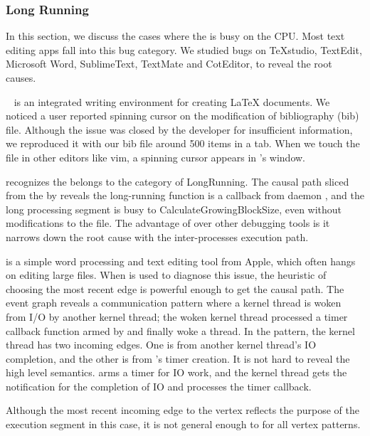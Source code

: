 \subsubsection{Long Running}

In this section, we discuss the cases where the \spinningnode is busy on the
CPU. Most text editing apps fall into this bug category. We studied bugs on
TeXstudio, TextEdit, Microsoft Word, SublimeText, TextMate and CotEditor,
to reveal the root causes.


~\cite{TeXStudio} is an integrated writing environment for
creating LaTeX documents. We noticed a user reported spinning cursor on the
modification of bibliography (bib) file. Although the issue was closed by the
developer for insufficient information, we reproduced it with our bib file
around 500 items in a  tab. When we touch the file in
other editors like vim, a spinning cursor appears in 's window.

\xxx recognizes the \spinningnode belongs to the category of LongRunning. The
causal path sliced from the \spinningnode by \xxx reveals the long-running
function is a callback from daemon , and the long processing segment
is busy to CalculateGrowingBlockSize, even without modifications to the file.
The advantage of \xxx over other debugging tools is it narrows down the root
cause with the inter-processes execution path.


 is a simple word processing and text editing tool from Apple,
which often hangs on editing large files.
When \xxx is used to diagnose
this issue, the heuristic of choosing the most recent edge is powerful enough 
to get the causal path.
The event graph reveals a communication pattern where a kernel thread is woken
from I/O by another kernel thread; the woken kernel thread processed
a timer callback function armed by  and finally woke a 
thread. In the pattern, the kernel thread has two incoming edges. One is from
another kernel thread's IO completion, and the other is from 's timer
creation. It is not hard to reveal the high level semantics.  arms a timer
for IO work, and the kernel thread gets the notification for the completion of IO
and processes the timer callback. 

Although the most recent incoming edge to the vertex reflects the purpose of
the execution segment in this case, it is not general enough to for all vertex
patterns.

